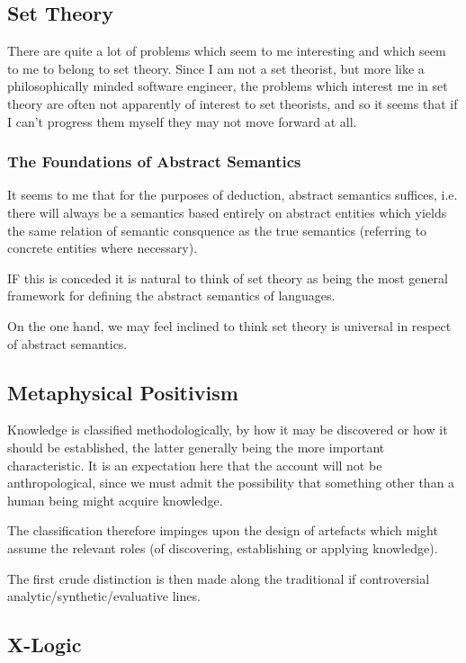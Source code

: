 \documentclass[numreferences]{rbjk}
\begin{document}
\begin{article}
\subsection{Set Theory}

There are quite a lot of problems which seem to me interesting and which seem to me to belong to set theory.
Since I am not a set theorist, but more like a philosophically minded software engineer, the problems which interest me in set theory are often not apparently of interest to set theorists, and so it seems that if I can't progress them myself they may not move forward at all.

\subsubsection{The Foundations of Abstract Semantics}

It seems to me that for the purposes of deduction, abstract semantics suffices, i.e. there will always be a semantics based entirely on abstract entities which yields the same relation of semantic consquence as the true semantics (referring to concrete entities where necessary).

IF this is conceded it is natural to think of set theory as being the most general framework for defining the abstract semantics of languages.

On the one hand, we may feel inclined to think set theory is universal in respect of abstract semantics.

\subsection{Metaphysical Positivism}

Knowledge is classified methodologically, by how it may be discovered or how it should be established, the latter generally being the more important characteristic.
It is an expectation here that the account will not be anthropological, since we must admit the possibility that something other than a human being might acquire knowledge.

The classification therefore impinges upon the design of artefacts which might assume the relevant roles (of discovering, establishing or applying knowledge).

The first crude distinction is then made along the traditional if controversial analytic/synthetic/evaluative lines.

\subsection{X-Logic}


\end{article}
\end{document}

